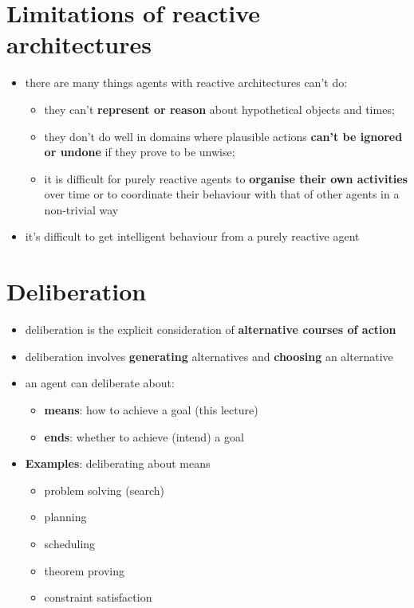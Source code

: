 \documentclass{article}
\begin{document}
\tableofcontents

\newpage

\section{Limitations of reactive architectures}
\begin{itemize}
  \item there are many things agents with reactive architectures can’t do:
  \begin{itemize}
    \item they can’t \textbf{represent or reason} about hypothetical objects and times;
    \item they don’t do well in domains where plausible actions \textbf{can’t be ignored or undone} if they prove to be unwise;
    \item it is difficult for purely reactive agents to \textbf{organise their own activities} over time or to coordinate their behaviour with that of other agents in a non-trivial way 
  \end{itemize}
  \item it’s difficult to get intelligent behaviour from a purely reactive agent
\end{itemize}

\section{Deliberation}
\begin{itemize}
  \item deliberation is the explicit consideration of \textbf{alternative courses of action} 
  \item deliberation involves \textbf{generating} alternatives and \textbf{choosing} an alternative 
  \item an agent can deliberate about:
  \begin{itemize}
    \item \textbf{means}: how to achieve a goal (this lecture)
    \item \textbf{ends}: whether to achieve (intend) a goal
  \end{itemize}
  \item \textbf{Examples}: deliberating about means
  \begin{itemize}
    \item problem solving (search) 
    \item planning 
    \item scheduling 
    \item theorem proving 
    \item constraint satisfaction
  \end{itemize}
\end{itemize}
\end{document}
